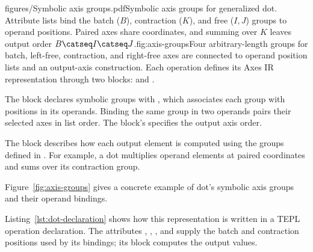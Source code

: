 \begin{figuretext}{figures/Symbolic axis groups.pdf}{Symbolic axis groups for generalized dot. Attribute lists bind the batch
($B$), contraction ($K$), and free ($I,J$) groups to operand positions.
Paired axes share coordinates, and summing over $K$ leaves output order
$B\catseq I\catseq J$.}{fig:axis-groups}{Four arbitrary-length groups for batch, left-free, contraction, and right-free
axes are connected to operand position lists and an output-axis construction.}
Each operation defines its Axes IR representation through two blocks:
 and .

The  block declares symbolic groups with , which
associates each group with positions in its operands. Binding the same
group in two operands pairs their selected axes in list order.
The block's  specifies the output axis order.

The  block describes how each output element is computed
using the groups defined in . For example, a dot multiplies
operand elements at paired coordinates and sums over its contraction group.

Figure~\ref{fig:axis-groups} gives a concrete example of dot's symbolic
axis groups and their operand bindings.

Listing~\ref{lst:dot-declaration} shows how this representation is written
in a TEPL operation declaration. The  attributes ,
, , and  supply the batch and contraction
positions used by its  bindings; its  block
computes the output values.

\end{figuretext}



